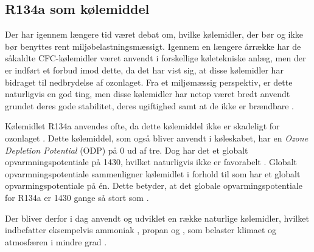 \documentclass[../Hovedrapport.tex]{subfiles}
\begin{document}
\subsection*{R134a som kølemiddel}
Der har igennem længere tid været debat om, hvilke kølemidler, der bør og ikke bør benyttes rent miljøbelastningsmæssigt. Igennem en længere årrække har de såkaldte CFC-kølemidler været anvendt i forskellige køletekniske anlæg, men der er indført et forbud imod dette, da det har vist sig, at disse kølemidler har bidraget til nedbrydelse af ozonlaget. Fra et miljømæssig perspektiv, er dette naturligvis en god ting, men disse kølemidler har netop været bredt anvendt grundet deres gode stabilitet, deres ugiftighed samt at de ikke er brændbare \citep{termo}. 

Kølemidlet R134a anvendes ofte, da dette kølemiddel ikke er skadeligt for ozonlaget \citep{termo}. Dette kølemiddel, som også bliver anvendt i køleskabet, har en \textit{Ozone Depletion Potential} (ODP) på 0 ud af tre. Dog har det et globalt opvarmningspotentiale på 1430, hvilket naturligvis ikke er favorabelt \citep{koelemiddelR}. 
Globalt opvarmningspotentiale sammenligner kølemidlet i forhold til  som har et globalt opvarmingspotentiale på én. Dette betyder, at det globale opvarmingspotentiale for R134a er 1430 gange så stort som  \citep{exp}.

Der bliver derfor i dag anvendt og udviklet en række naturlige kølemidler, hvilket indbefatter eksempelvis ammoniak , propan og , som belaster klimaet og atmosfæren i mindre grad . \citep{termo}

\end{document}

